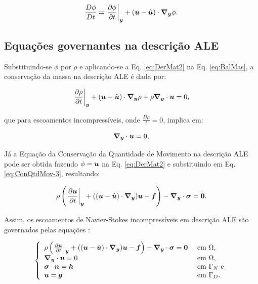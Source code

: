 \begin{equation}
    \frac{D\phi}{Dt}=\left.\frac{\partial \phi}{\partial t}\right|_{\boldsymbol{y}}+(\boldsymbol{u}-\hat{\boldsymbol{u}})\cdot\boldsymbol{\nabla_y}\phi\text{.}
    \label{eq:DerMat2}
\end{equation}

\subsection{Equações governantes na descrição ALE}

Substituindo-se $\phi$ por $\rho$ e aplicando-se a Eq. \eqref{eq:DerMat2} na Eq. \eqref{eq:BalMas}, a conservação da massa na descrição ALE é dada por:

\begin{equation}
    \left.\frac{\partial \rho}{\partial t}\right|_{\boldsymbol{y}}+(\boldsymbol{u}-\hat{\boldsymbol{u}})\cdot\boldsymbol{\nabla_y}\rho+\rho\boldsymbol{\nabla_y}\cdot\boldsymbol{u}=0\text{,}
\end{equation}

\noindent que para escoamentos incompressíveis, onde $\frac{D \rho}{t}=0$, implica em:

\begin{equation}
    \boldsymbol{\nabla_y}\cdot\boldsymbol{u}=0\text{,}
    \label{eq:ALE-cont}
\end{equation}

Já a Equação da Conservação da Quantidade de Movimento na descrição ALE pode ser obtida fazendo $\mathbf{\phi}=\boldsymbol{u}$ na Eq. \eqref{eq:DerMat2} e substituindo em Eq. \eqref{eq:ConQtdMov-3}, resultando:

\begin{equation}
    \rho\left({\left.\frac{\partial \boldsymbol{u}}{\partial t}\right|_{\boldsymbol{y}}+((\boldsymbol{u}-\hat{\boldsymbol{u}})\cdot\boldsymbol{\nabla_y})\boldsymbol{u}-\boldsymbol{f}}\right)-\boldsymbol{\nabla_y}\cdot\boldsymbol{\sigma}=\boldsymbol{0}\text{.}
    \label{eq:ALE-mov}
\end{equation}

Assim, os escoamentos de Navier-Stokes incompressíveis em descrição ALE são governados pelas equações \cite{bazilevs2013computational}:

\begin{equation}
    \left\{
    \begin{array}{ll}
        \rho\left({\left.\frac{\partial \boldsymbol{u}}{\partial t}\right|_{\boldsymbol{y}}+((\boldsymbol{u}-\hat{\boldsymbol{u}})\cdot\boldsymbol{\nabla_y})\boldsymbol{u}-\boldsymbol{f}}\right)-\boldsymbol{\nabla_y}\cdot\boldsymbol{\sigma}=\boldsymbol{0} & \text{ em }\Omega\text{,}    \\
        \boldsymbol{\nabla_y}\cdot\boldsymbol{u}=0                                                                         & \text{ em }\Omega\text{,}    \\
        \boldsymbol{\sigma}\cdot\boldsymbol{n}=\boldsymbol{h}                                                                  & \text{ em }\Gamma_N\text{ e} \\
        \boldsymbol{u}=\boldsymbol{g}                                                                            & \text{ em }\Gamma_D\text{.}
    \end{array}
    \right.
    \label{eq:NS-ALE}
\end{equation}

